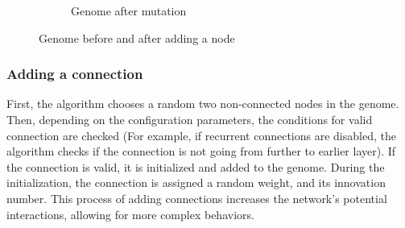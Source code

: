 \documentclass{article}
\begin{document}
\begin{figure}[h]
\begin{subfigure}{.5\textwidth}
      \caption{Genome after mutation}
    \end{subfigure}
    \caption{Genome before and after adding a node}
  \end{figure}

\subsubsection{Adding a connection}
First, the algorithm chooses a random two non-connected nodes in the genome. Then, depending on the configuration parameters, the conditions for valid connection
are checked (For example, if recurrent connections are disabled, the algorithm checks if the connection is not going from further to earlier layer). 
If the connection is valid, it is initialized and added to the genome. During the initialization, the connection is assigned a random weight, and its innovation
number.
This process of adding connections increases the network's potential interactions, allowing for more complex behaviors.
\end{document}
